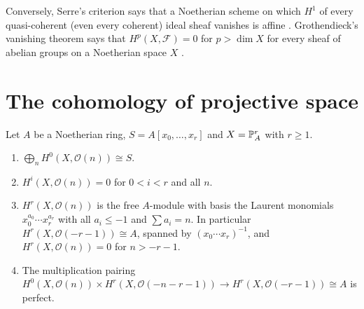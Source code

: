 \begin{remark}\label{coherent-cohomology:remark-serre-criterion}
Conversely, Serre's criterion says that a Noetherian scheme on which $H^1$ of every quasi-coherent (even every coherent) ideal sheaf vanishes is
affine \cite[Theorem III.3.7]{hartshorne-ag}. Grothendieck's vanishing theorem says that $H^p(X, \mathcal{F}) = 0$ for $p > \dim X$ for every sheaf of abelian
groups on a Noetherian space $X$ \cite[Theorem III.2.7]{hartshorne-ag}.
\end{remark}

\section{The cohomology of projective space}\label{coherent-cohomology:section-projective-space}

\begin{theorem}\label{coherent-cohomology:theorem-projective-space}
Let $A$ be a Noetherian ring, $S = A[x_0, \ldots, x_r]$ and $X = \mathbb{P}^r_A$ with $r \geq 1$.
\begin{enumerate}
\item $\bigoplus_nH^0(X, \mathcal{O}(n)) \cong S$.
\item $H^i(X, \mathcal{O}(n)) = 0$ for $0 < i < r$ and all $n$.
\item $H^r(X, \mathcal{O}(n))$ is the free $A$-module with basis the Laurent monomials $x_0^{a_0} \cdots x_r^{a_r}$ with all $a_i \leq -1$ and $\sum a_i = n$. In particular
$H^r(X, \mathcal{O}(-r-1)) \cong A$, spanned by $(x_0 \cdots x_r)^{-1}$, and $H^r(X, \mathcal{O}(n)) = 0$ for $n > -r-1$.
\item The multiplication pairing $H^0(X, \mathcal{O}(n)) \times H^r(X, \mathcal{O}(-n-r-1)) \to H^r(X, \mathcal{O}(-r-1)) \cong A$ is perfect.
\end{enumerate}
\end{theorem}

